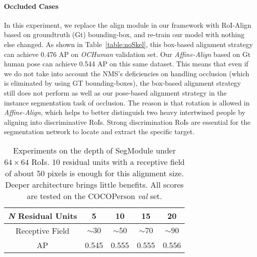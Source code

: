 \documentclass[10pt,twocolumn,letterpaper]{article}
\begin{document}
\paragraph{Occluded Cases} In this experiment, we replace the align module in our framework with RoI-Align based on groundtruth (Gt) bounding-box, and re-train our model with nothing else changed. As shown in Table~\ref{table:noSkel}, this box-based alignment strategy can achieve 0.476 AP on \emph{OCHuman} validation set. Our \emph{Affine-Align} based on Gt human pose can achieve 0.544 AP on this same dataset. This means that even if we do not take into account the NMS's deficiencies on handling occlusion (which is eliminated by using GT bounding-boxes), the box-based alignment strategy still does not perform as well as our pose-based alignment strategy in the instance segmentation task of occlusion. The reason is that rotation is allowed in \emph{Affine-Align}, which helps to better distinguish two heavy intertwined people by aligning into discriminative RoIs. Strong discrimination RoIs are essential for the segmentation network to  locate and extract the specific target. 

\setlength{\tabcolsep}{8pt}
\begin{table}[t]
\small
\begin{center}
\begin{tabular}{ccccc}
\toprule[1.5pt]
\emph{N} Residual Units & 5 & 10 & 15 & 20 \\
\midrule[0.5pt]
Receptive Field   & $\sim30$ & $\sim50$ & $\sim70$ & $\sim90$  \\
\midrule[0.5pt]
AP   & 0.545 & 0.555 & 0.555 & 0.556  \\
\bottomrule[1.5pt]
\end{tabular}
\end{center}
\setlength{\abovecaptionskip}{-0.1cm}
\setlength{\belowcaptionskip}{-0.5cm}
\caption{Experiments on the depth of SegModule under $64\times64$ RoIs. 10 residual units with a receptive field of about 50 pixels is enough for this alignment size. Deeper architecture brings little benefits. All scores are tested on the COCOPerson \emph{val} set.}
\label{table:segmodule}
\end{table}


\vspace{-0.3cm}
\end{document}
